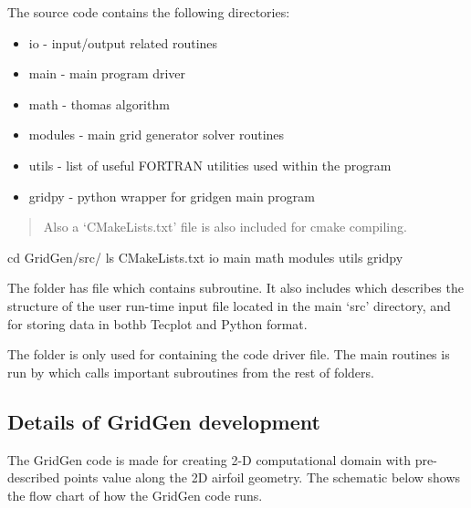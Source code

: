 \documentclass[letterpaper,10pt,english]{sphinxmanual}
\begin{document}
The source code contains the following directories:
\begin{itemize}
\item {} 
io - input/output related routines

\item {} 
main - main program driver

\item {} 
math - thomas algorithm

\item {} 
modules - main grid generator solver routines

\item {} 
utils - list of useful FORTRAN utilities used within the program

\item {} 
gridpy - python wrapper for gridgen main program

\end{itemize}
\begin{quote}

Also a ‘CMakeLists.txt’ file is also included for cmake compiling.
\end{quote}

\begin{sphinxVerbatim}[commandchars=\\\{\}]
\PYGZdl{} cd GridGen/src/
\PYGZdl{} ls
\PYGZdl{} CMakeLists.txt  io  main math modules utils gridpy
\end{sphinxVerbatim}

The  folder has  file which contains  subroutine. It also includes  which describes the structure of the user run-time input file located in the main ‘src’ directory, and  for storing data in bothb Tecplot and Python format.

The  folder is only used for containing the code driver file. The main routines is run by  which calls important subroutines from the rest of folders.


\subsection{Details of GridGen development}
\label{\detokenize{devel:details-of-gridgen-development}}
The GridGen code is made for creating 2-D computational domain with pre-described points value along the 2D airfoil geometry. The schematic below shows the flow chart of how the GridGen code runs.
\end{document}
